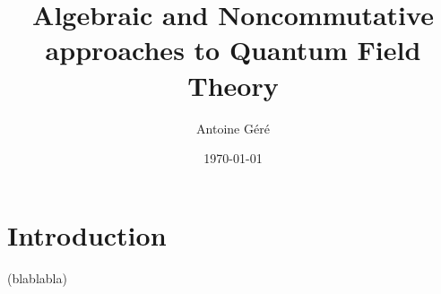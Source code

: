 \documentclass{book}
\begin{document}

\title{Algebraic and Noncommutative approaches to Quantum Field Theory}

\author{Antoine Géré}

\date{\today}

\maketitle


\tableofcontents


\chapter{Introduction}

(blablabla)

\end{document}
